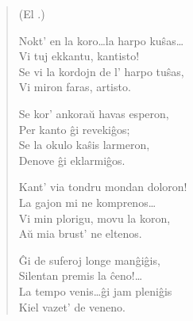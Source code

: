 \begin{verse}
\begin{center}
\footnotesize (El .)
\end{center}
                  Nokt' en la koro\dots la harpo ku\^sas\dots\\
                  Vi tuj ekkantu, kantisto!\\
                  Se vi la kordojn de l' harpo tu\^sas,\\
                  Vi miron faras, artisto.

                  Se kor' ankora\u u havas esperon,\\
                  Per kanto \^gi reveki\^gos;\\
                  Se la okulo ka\^sis larmeron,\\
                  Denove \^gi eklarmi\^gos.

                  Kant' via tondru mondan doloron!\\
                  La gajon mi ne komprenos\dots\\
                  Vi min plorigu, movu la koron,\\
                  A\u u mia brust' ne eltenos.

                  \^Gi de suferoj longe man\^gi\^gis,\\
                  Silentan premis la \^ceno!\dots\\
                  La tempo venis\dots \^gi jam pleni\^gis\\
                  Kiel vazet' de veneno.

\end{verse}


\smallrule{}